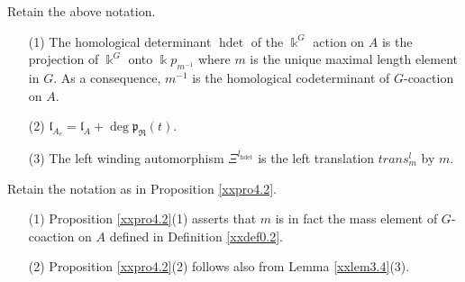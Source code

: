 \begin{proposition}
\label{xxpro4.2} Retain the above notation.
\begin{enumerate}
\item[(1)]
The homological determinant $\operatorname{hdet}$ of the $\Bbbk^G$ action 
on $A$ is the projection of $\Bbbk^G$ onto $\Bbbk p_{m^{-1}}$ 
where $m$ is the unique maximal length element 
in $G$. As a consequence, $m^{-1}$ is the homological
codeterminant of $G$-coaction on $A$. 
\item[(2)]
${\mathfrak l}_{A_e}={\mathfrak l}_A+ \deg {\mathfrak{p}}_\Re(t)$.
\item[(3)]
The left winding automorphism $\Xi^l_\operatorname{hdet}$ is the 
left translation $trans^l_{m}$ by $m$.
\end{enumerate}
\end{proposition}

\begin{remark}
\label{xxrem4.3} Retain the notation as in Proposition 
\ref{xxpro4.2}.
\begin{enumerate}
\item[(1)]
Proposition \ref{xxpro4.2}(1) 
asserts that $m$ is in fact the mass element of 
$G$-coaction on $A$ defined in Definition \ref{xxdef0.2}.
\item[(2)]
Proposition \ref{xxpro4.2}(2) follows also from Lemma 
\ref{xxlem3.4}(3).
\end{enumerate}
\end{remark}

